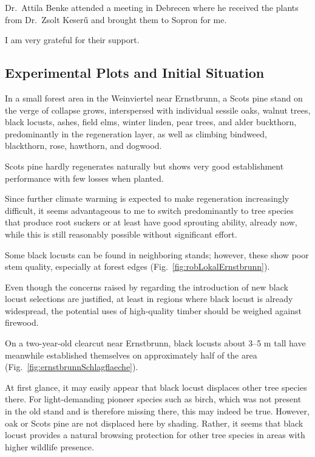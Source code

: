 Dr.~Attila Benke attended a meeting in Debrecen where he received the plants from Dr.~Zsolt Keserű and brought them to Sopron for me.

I am very grateful for their support.

\subsection{Experimental Plots and Initial Situation}

In a small forest area in the Weinviertel near Ernstbrunn, a Scots pine stand on the verge of collapse grows, interspersed with individual sessile oaks, walnut trees, black locusts, ashes, field elms, winter linden, pear trees, and alder buckthorn, predominantly in the regeneration layer, as well as climbing bindweed, blackthorn, rose, hawthorn, and dogwood.

Scots pine hardly regenerates naturally but shows very good establishment performance with few losses when planted.

Since further climate warming is expected to make regeneration increasingly difficult, it seems advantageous to me to switch predominantly to tree species that produce root suckers or at least have good sprouting ability, already now, while this is still reasonably possible without significant effort.

Some black locusts can be found in neighboring stands; however, these show poor stem quality, especially at forest edges (Fig.~\ref{fig:robLokalErnstbrunn}).


Even though the concerns raised by \citet{bouteiller2019robinie} regarding the introduction of new black locust selections are justified, at least in regions where black locust is already widespread, the potential uses of high-quality timber should be weighed against firewood.

On a two-year-old clearcut near Ernstbrunn, black locusts about 3–5 m tall have meanwhile established themselves on approximately half of the area (Fig.~\ref{fig:ernstbrunnSchlagflaeche}).


At first glance, it may easily appear that black locust displaces other tree species there. For light-demanding pioneer species such as birch, which was not present in the old stand and is therefore missing there, this may indeed be true. However, oak or Scots pine are not displaced here by shading. Rather, it seems that black locust provides a natural browsing protection for other tree species in areas with higher wildlife presence.


